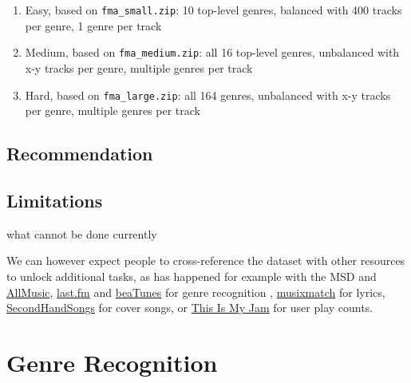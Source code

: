 \documentclass{article}
\newcommand{\todo}[1]{{\color{red} #1 }}
\begin{document}
\begin{enumerate}
	\item Easy, based on \texttt{fma\_small.zip}: 10 top-level genres, balanced with 400 tracks per genre, 1 genre per track
	\item Medium, based on \texttt{fma\_medium.zip}: all 16 top-level genres, unbalanced with x-y tracks per genre, multiple genres per track
	\item Hard, based on \texttt{fma\_large.zip}: all 164 genres, unbalanced with x-y tracks per genre, multiple genres per track
\end{enumerate}

\subsection{Recommendation} %

\subsection{Limitations}

\todo{what cannot be done currently}


We can however expect people to cross-reference the dataset with other resources to unlock additional tasks, as has happened for example with the MSD and \href{http://www.allmusic.com}{AllMusic}, \href{https://www.last.fm}{last.fm} and \href{https://beatunes.com}{beaTunes} for genre recognition \cite{msd_features, msd_genres}, \href{https://musixmatch.com}{musixmatch} for lyrics, \href{https://secondhandsongs.com}{SecondHandSongs} for cover songs, or \href{https://www.thisismyjam.com}{This Is My Jam} for user play counts.


\section{Genre Recognition} %
\end{document}
